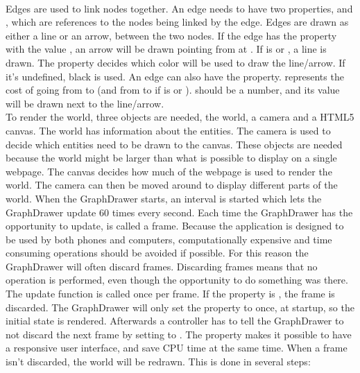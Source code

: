 \\[11pt]
Edges are used to link nodes together. An edge needs to have two properties,  and , which are references to the nodes being linked by the edge. Edges are drawn as either a line or an arrow, between the two nodes. If the edge has the property  with the value , an arrow will be drawn pointing from  at . If  is  or , a line is drawn. The  property decides which color will be used to draw the line/arrow. If it's undefined, black is used. An edge can also have the  property.  represents the cost of going from  to  (and from  to  if  is  or ).  should be a number, and its value will be drawn next to the line/arrow.
\\[11pt]
To render the world, three objects are needed, the world, a camera and a HTML5 canvas. The world has information about the entities. The camera is used to decide which entities need to be drawn to the canvas. These objects are needed because the world might be larger than what is possible to display on a single webpage. The canvas decides how much of the webpage is used to render the world. The camera can then be moved around to display different parts of the world. When the GraphDrawer starts, an interval is started which lets the GraphDrawer update 60 times every second. Each time the GraphDrawer has the opportunity to update, is called a frame. Because the application is designed to be used by both phones and computers, computationally expensive and time consuming operations should be avoided if possible. For this reason the GraphDrawer will often discard frames. Discarding frames means that no operation is performed, even though the opportunity to do something was there. The update function is called once per frame. If the  property is , the frame is discarded. The GraphDrawer will only set the  property to  once, at startup, so the initial state is rendered. Afterwards a controller has to tell the GraphDrawer to not discard the next frame by setting  to . The  property makes it possible to have a responsive user interface, and save CPU time at the same time. When a frame isn't discarded, the world will be redrawn. This is done in several steps:
